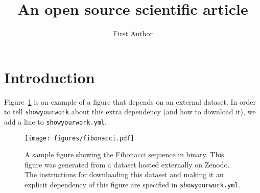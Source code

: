 \documentclass[twocolumn]{aastex631}
\begin{document}
\title{An open source scientific article}

\author{First Author}

\begin{abstract}
    \blindtext
\end{abstract}

\section{Introduction}

Figure~\ref{fig:fibonacci} is an example of a figure that depends on an external dataset.
In order to tell \texttt{showyourwork} about this extra dependency (and how to download it), we add a line to \texttt{showyourwork.yml}.

\begin{figure}[ht!]
    \begin{centering}
        \texttt{[image: figures/fibonacci.pdf]}
        \caption{
            A sample figure showing the Fibonacci sequence in binary.
            This figure was generated from a dataset hosted externally on Zenodo. 
            The instructions for downloading this dataset and making it an explicit dependency of this figure are specified in \texttt{showyourwork.yml}.
        }
        \label{fig:fibonacci}
    \end{centering}
\end{figure}
\end{document}
